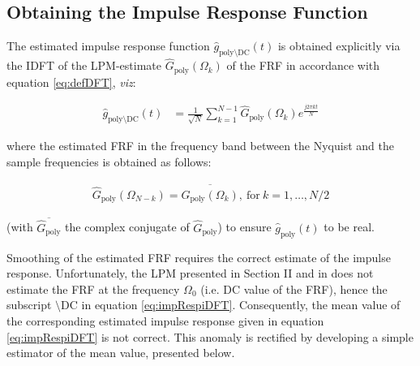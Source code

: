 
\subsection{Obtaining the Impulse Response Function}

The estimated impulse response function  $\hat g_{\mathrm{poly}\setminus \mathrm{DC
}}(t)$ is obtained explicitly via the IDFT of the LPM-estimate $\hat G_\mathrm{poly}(\Omega_k)$ of the FRF in accordance with equation \eqref{eq:defDFT}, \emph{viz}:

\begin{align}\label{eq:impRespiDFT}
\hat g_{\mathrm{poly}\setminus \mathrm{DC
}}(t) &= \frac{1}{\sqrt{N}}\sum_{k=1}^{N-1}\hat G_\mathrm{poly}(\Omega_k)e^{\frac{j2\pi kt}{N}}
\end{align}

\noindent where the estimated FRF in the frequency band between  the Nyquist and the sample frequencies is obtained as follows:

\begin{align}
\hat G_\mathrm{poly}(\Omega_{N-k}) = \overline{\hat G_\mathrm{poly}(\Omega_k)},\ \text{for}\ k=1,\dots,N/2
\end{align}

\noindent 
(with $\overline{\hat G_\mathrm{poly}}$ the complex conjugate of $\hat G_\mathrm{poly}$)
to ensure $\hat g_\mathrm{poly}(t)$ to be real.

Smoothing of the estimated FRF requires the correct estimate of the impulse response. Unfortunately, the LPM presented in Section II and in \cite{schoukens2010nonparametric} does not estimate the FRF  at the frequency $\Omega_0$ (i.e. DC value of the FRF), hence the subscript $\setminus\mathrm{DC}$ in equation \eqref{eq:impRespiDFT}. Consequently, the mean value of the corresponding estimated impulse response given in equation \eqref{eq:impRespiDFT} is not correct. This anomaly is rectified by developing a simple estimator of the mean value, presented below.
